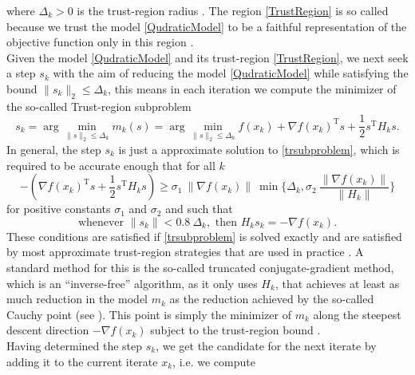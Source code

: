 where $\Delta_k > 0$ is the trust-region radius \cite[p.~115]{ConnGouldToint:2000}. The region \cref{TrustRegion} is so called because we trust the model \cref{QudraticModel} to be a faithful representation of the objective function only in this region \cite[p.~2]{ConnGouldToint:2000}. \\
Given the model \cref{QudraticModel} and its trust-region \cref{TrustRegion}, we next seek a step $s_k$ with the aim of reducing the model \cref{QudraticModel} while satisfying the bound $\lVert s_k \rVert_2 \leq \Delta_k$, this means in each iteration we compute the minimizer of the so-called Trust-region subproblem
\begin{equation}\label{trsubproblem}
    s_k = \arg \min_{\lVert s \rVert_2 \leq \Delta_k} m_k(s) = \arg \min_{\lVert s \rVert_2 \leq \Delta_k} f(x_k) + \nabla f(x_k)^{\mathrm{T}} s + \frac{1}{2} s^{\mathrm{T}} H_k s.
\end{equation}
In general, the step $s_k$ is just a approximate solution to \cref{trsubproblem}, which is required to be accurate enough that for all $k$
\begin{equation}\label{accuracy1}
    -(\nabla f(x_k)^{\mathrm{T}} s + \frac{1}{2} s^{\mathrm{T}} H_k s) \geq \sigma_1 \ \lVert \nabla f(x_k) \rVert \ \min \{ \Delta_k, \sigma_2 \ \frac{\lVert \nabla f(x_k) \rVert}{\lVert H_k \rVert} \} 
\end{equation} 
for positive constants $\sigma_1$ and $\sigma_2$ and such that 
\begin{equation}\label{accuracy2}
    \text{whenever } \lVert s_k \rVert < 0.8 \ \Delta_k, \text{ then } H_k s_k = - \nabla f(x_k).
\end{equation}
These conditions are satisfied if \cref{trsubproblem} is solved exactly and are satisfied by most approximate trust-region strategies that are used in practice \cite[p.~1027]{ByrdKhalfanSchnabel:1996}. A standard method for this is the so-called truncated conjugate-gradient method, which is an “inverse-free” algorithm, as it only uses $H_k$, that achieves at least as much reduction in the model $m_k$ as the reduction achieved by the so-called Cauchy point (see \cite[4.1~Algorithms~based~on~the~cauchy~point]{NocedalWright:2006}). This point is simply the minimizer of $m_k$ along the steepest descent direction $- \nabla f(x_k)$ subject to the trust-region bound \cite[p.~71]{NocedalWright:2006}. \\
Having determined the step $s_k$, we get the candidate for the next iterate by adding it to the current iterate $x_k$, i.e. we compute 

